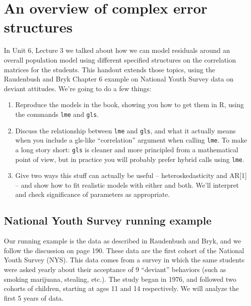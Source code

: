 \documentclass[
  letterpaper,
  DIV=11,
  numbers=noendperiod]{scrreprt}
\begin{document}
\hypertarget{an-overview-of-complex-error-structures}{%
\chapter{An overview of complex error
structures}\label{an-overview-of-complex-error-structures}}

In Unit 6, Lecture 3 we talked about how we can model residuals around
an overall population model using different specified structures on the
correlation matrices for the students. This handout extends those
topics, using the Raudenbush and Bryk Chapter 6 example on National
Youth Survey data on deviant attitudes. We're going to do a few things:

\begin{enumerate}
\def\labelenumi{\arabic{enumi}.}
\item
  Reproduce the models in the book, showing you how to get them in R,
  using the commands \texttt{lme} and \texttt{gls}.
\item
  Discuss the relationship between \texttt{lme} and \texttt{gls}, and
  what it actually means when you include a gls-like ``correlation''
  argument when calling \texttt{lme}. To make a long story short:
  \texttt{gls} is cleaner and more principled from a mathematical point
  of view, but in practice you will probably prefer hybrid calls using
  \texttt{lme}.
\item
  Give two ways this stuff can actually be useful -- heteroskedasticity
  and AR{[}1{]} -- and show how to fit realistic models with either and
  both. We'll interpret and check significance of parameters as
  appropriate.
\end{enumerate}

\hypertarget{national-youth-survey-running-example}{%
\section{National Youth Survey running
example}\label{national-youth-survey-running-example}}

Our running example is the data as described in Raudenbush and Bryk, and
we follow the discussion on page 190. These data are the first cohort of
the National Youth Survey (NYS). This data comes from a survey in which
the same students were asked yearly about their acceptance of 9
``deviant'' behaviors (such as smoking marijuana, stealing, etc.). The
study began in 1976, and followed two cohorts of children, starting at
ages 11 and 14 respectively. We will analyze the first 5 years of data.
\end{document}
